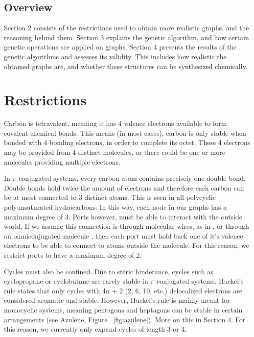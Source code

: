 \documentclass[12pt]{article}
\begin{document}
\subsection{Overview}

Section 2 consists of the restrictions used to obtain more realistic graphs, and the reasoning behind them. Section 3 explains the genetic algorithm, and how certain genetic operations are applied on graphs. Section 4 presents the results of the genetic algorithms and assesses its validity. This includes how realistic the obtained graphs are, and whether these structures can be synthesized chemically. %

\section{Restrictions}

Carbon is tetravalent, meaning it has 4 valence electrons available to form covalent chemical bonds. This means (in most cases), carbon is only stable when bonded with 4 bonding electrons, in order to complete its octet. These 4 electrons may be provided from 4 distinct molecules, or there could be one or more molecules providing multiple electrons.

In $\pi$ conjugated systems, every carbon atom contains precisely one double bond. Double bonds hold twice the amount of electrons and therefore each carbon can be at most connected to 3 distinct atoms. This is seen in all polycyclic polyunsaturated hydrocarbons. In this way, each node in our graphs has a maximum degree of 3. Ports however, must be able to interact with the outside world. If we assume this connection is through molecular wires, as in \cite{9}, or through an omniconjugated molecule \cite{v06}, then each port must hold back one of it's valence electrons to be able to connect to atoms outside the molecule. For this reason, we restrict ports to have a maximum degree of 2. 

Cycles must also be confined. Due to steric hinderance, cycles such as cyclopropane or cyclobutane are rarely stable in $\pi$ conjugated systems. Huckel's rule states that only cycles with 4n + 2 (2, 6, 10, etc.) delocalized electrons are considered aromatic and stable. However, Huckel's rule is mainly meant for monocyclic systems, meaning pentagons and heptagons can be stable in certain arrangements (see Azulene, Figure ~\ref{fig:azulene}). More on this in Section 4. For this reason, we currently only expand cycles of length 3 or 4. 
\end{document}
